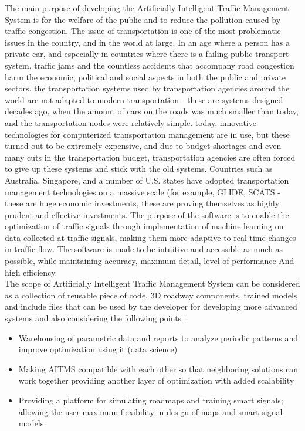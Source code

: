 \documentclass[openany,12pt]{report}
\begin{document}
	\hspace*{0.5in}The main purpose of developing the Artificially Intelligent Traffic Management System is for the welfare of the public and to reduce the pollution caused by traffic congestion. The issue of transportation is one of the most problematic issues in the country, and in the world at large. In an age where a person has a private car, and especially in countries where there is a failing public transport system, traffic jams and the countless accidents that accompany road congestion harm the economic, political and social aspects in both the public and private sectors. the transportation systems used by transportation agencies around the world are not adapted to modern transportation - these are systems designed decades ago, when the amount of cars on the roads was much smaller than today, and the transportation nodes were relatively simple. today, innovative technologies for computerized transportation management are in use, but these turned out to be extremely expensive, and due to budget shortages and even many cuts in the transportation budget, transportation agencies are often forced to give up these systems and stick with the old systems. Countries such as Australia, Singapore, and a number of U.S. states have adopted transportation management technologies on a massive scale (for example, GLIDE, SCATS\cite{paper6} - these are huge economic investments, these are proving themselves as highly prudent and effective investments. The purpose of the software is to enable the optimization of traffic signals through implementation of machine learning on data collected at traffic signals, making them more adaptive to real time changes in traffic flow. The software is made to be intuitive and accessible as much as possible, while maintaining accuracy, maximum detail, level of performance And high efficiency.
	\\The scope of Artificially Intelligent Traffic Management System can be considered as a collection of reusable piece of code, 3D roadway components, trained models and include files that can be used by the developer for developing more advanced systems and also considering the following points :
	\begin{itemize}
		\item{Warehousing of parametric data and reports to analyze periodic patterns and improve optimization using it (data science)}
		\item{Making AITMS compatible with each other so that neighboring solutions can work together providing another layer of optimization with added scalability}
		\item{Providing a platform for simulating roadmaps and training smart signals; allowing the user maximum flexibility in design of maps and smart signal models}
	\end{itemize}
	
\end{document}

